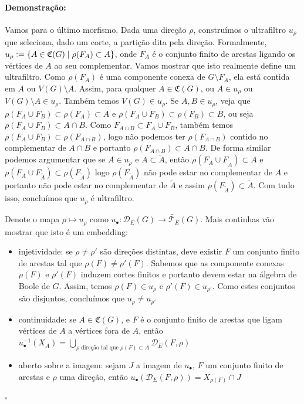 \documentclass[11pt]{article}
\newcommand{\defeq}{\vcentcolon=}
\newcommand{\pulinho}{\vspace{.5cm}}
\theoremstyle{definition}
\theoremstyle{definition}
\theoremstyle{definition}
\theoremstyle{definition}
\theoremstyle{definition}
\theoremstyle{definition}
\theoremstyle{definition}
\theoremstyle{definition}
\theoremstyle{definition}
\theoremstyle{definition}
\theoremstyle{definition}
\theoremstyle{definition}
\newenvironment{prova}{\paragraph{Demonstração:}}{\hfill$\square$ 
\pulinho
}
\begin{document}
\begin{prova}
Vamos para o último morfismo. Dada uma direção $\rho$, construímos o ultrafiltro $u_\rho$ que seleciona, dado um corte, a partição dita pela direção. Formalmente, $u_\rho \defeq \{ A \in \mathfrak{C}(G) \mid \rho(F_A) \subset A \}$, onde $F_A$ é o conjunto finito de arestas ligando os vértices de $A$ ao seu complementar. Vamos mostrar que isto realmente define um ultrafiltro. Como $\rho(F_A)$ é uma componente conexa de $G \setminus F_A$, ela está contida em $A$ ou $V(G) \setminus A$. Assim, para qualquer $A \in \mathfrak{C}(G)$, ou $A \in u_\rho$ ou $V(G) \setminus A \in u_\rho$. Também temos $V(G) \in u_\rho$. Se $A,B \in u_\rho$, veja que  $\rho(F_A \cup F_B) \subset \rho(F_A) \subset A $ e $\rho(F_A \cup F_B) \subset \rho(F_B) \subset B$, ou seja $\rho(F_A \cup F_B) \subset A \cap B$. Como $F_{A\cap B} \subset F_A \cup F_B$, também temos $\rho(F_A \cup F_B) \subset \rho(F_{A\cap B})$, logo não podemos ter $\rho(F_{A\cap B})$ contido no complementar de $A \cap B$ e portanto $\rho(F_{A\cap B}) \subset A \cap B$. De forma similar podemos argumentar que se $A \in u_\rho$ e $A \subset \tilde{A}$, então $\rho(F_A \cup F_{\tilde{A}}) \subset A$ e $\rho(F_A \cup F_{\tilde{A}}) \subset \rho(F_{\tilde{A}})$ logo $\rho(F_{\tilde{A}})$ não pode estar no complementar de $A$ e portanto não pode estar no complementar de $\tilde{A}$ e assim $\rho(F_{\tilde{A}}) \subset \tilde{A}$. Com tudo isso, concluímos que $u_\rho$ é ultrafiltro.

Denote o mapa $\rho \mapsto u_\rho$ como $u_\bullet: \mathcal{D}_E(G) \rightarrow \widetilde{\mathcal{T}_E}(G)$. Mais continhas vão mostrar que isto é um embedding:

\begin{itemize}[]
    \item injetividade: se $\rho \neq \rho'$ são direções distintas, deve existir $F$ um conjunto finito de arestas tal que $\rho(F) \neq \rho'(F)$. Sabemos que as componente conexas $\rho(F)$ e $\rho'(F)$ induzem cortes finitos e portanto devem estar na álgebra de Boole de $G$. Assim, temos $\rho(F) \in u_\rho$ e $\rho'(F) \in u_{\rho'}$. Como estes conjuntos são disjuntos, concluímos que $u_\rho \neq u_{\rho'}$
    \item continuidade: se $A \in \mathfrak{C}(G)$, e $F$ é o conjunto finito de arestas que ligam vértices de $A$ a vértices fora de $A$, então $u_\bullet^{-1}(X_A) = \underset{\rho \text{ direção tal que } \rho(F) \subset A}{\bigcup}\mathcal{D}_E(F,\rho)$
    \item aberto sobre a imagem: sejam $J$ a imagem de $u_\bullet$, $F$ um conjunto finito de arestas e $\rho$ uma direção, então $u_\bullet(\mathcal{D}_E(F,\rho)) = X_{\rho(F)} \cap J$
\end{itemize}


\end{prova}
\end{document}
